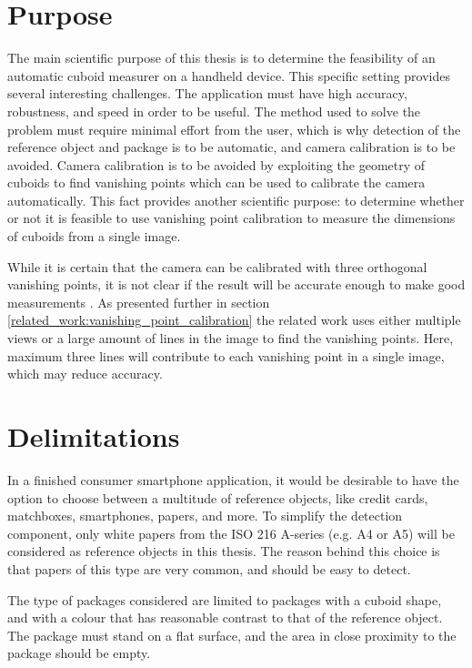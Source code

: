 \section{Purpose} 
The main scientific purpose of this thesis is to determine the feasibility of an automatic cuboid measurer on a handheld device.
This specific setting provides several interesting challenges.
The application must have high accuracy, robustness, and speed in order to be useful.
The method used to solve the problem must require minimal effort from the user, which is why detection of the reference object and package is to be automatic, and camera calibration is to be avoided.
Camera calibration is to be avoided by exploiting the geometry of cuboids to find vanishing points which can be used to calibrate the camera automatically.
This fact provides another scientific purpose: to determine whether or not it is feasible to use vanishing point calibration to measure the dimensions of cuboids from a single image.

While it is certain that the camera can be calibrated with three orthogonal vanishing points, it is not clear if the result will be accurate enough to make good measurements \cite[195-226]{hartley-zisserman}.
As presented further in section \ref{related_work:vanishing_point_calibration} the related work uses either multiple views or a large amount of lines in the image to find the vanishing points.
Here, maximum three lines will contribute to each vanishing point in a single image, which may reduce accuracy.

\section{Delimitations}
In a finished consumer smartphone application, it would be desirable to have the option to choose between a multitude of reference objects, like credit cards, matchboxes, smartphones, papers, and more. 
To simplify the detection component, only white papers from the ISO 216 A-series (e.g. A4 or A5) will be considered as reference objects in this thesis.
The reason behind this choice is that papers of this type are very common, and should be easy to detect.

The type of packages considered are limited to packages with a cuboid shape, and with a colour that has reasonable contrast to that of the reference object. The package must stand on a flat surface, and the area in close proximity to the package should be empty.

